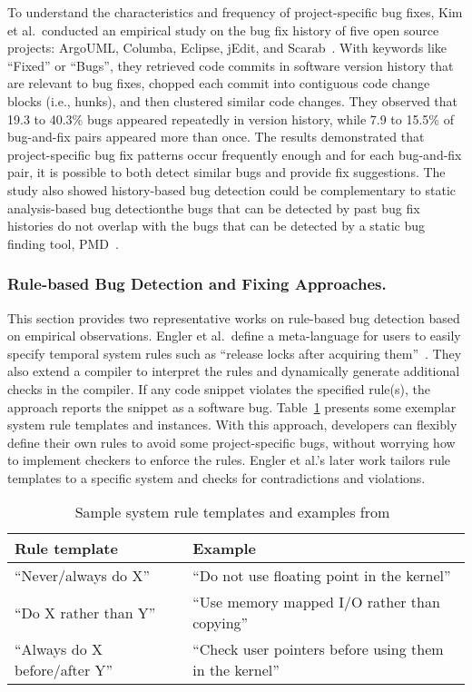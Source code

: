 To understand the characteristics and frequency of project-specific bug fixes, Kim et al.~conducted an empirical study on the bug fix history of five open source projects: ArgoUML, Columba, Eclipse, jEdit, and Scarab~\cite{Kim2006:MBF}. With keywords like ``Fixed'' or ``Bugs'', they retrieved code commits in software version history that are relevant to bug fixes, chopped each commit into contiguous code change blocks (i.e., hunks), and then clustered similar code changes. They observed that 19.3 to 40.3\% bugs appeared repeatedly in version history, while 7.9 to 15.5\% of bug-and-fix pairs appeared more than once. The results demonstrated that project-specific bug fix patterns occur frequently enough and for each bug-and-fix pair, it is possible to both detect similar bugs and provide fix suggestions. The study also showed history-based bug detection could be complementary to static analysis-based bug detection\textemdash the bugs that can be detected by past bug fix histories do not overlap with the bugs that can be detected by a static bug finding tool, PMD~\cite{PMD}. 


\subsubsection{Rule-based Bug Detection and Fixing Approaches.}
This section provides two representative works on rule-based bug detection based on empirical observations.
Engler et al.~define a meta-language for users to easily specify temporal system rules such as ``release locks after acquiring them''~\cite{Engler2000:CSR}. They also extend a compiler to interpret the rules and dynamically generate additional checks in the compiler. If any code snippet violates the specified rule(s), the approach reports the snippet as a software bug. Table~\ref{tab:rule} presents some exemplar system rule templates and instances. With this approach, developers can flexibly define their own rules to avoid some project-specific bugs, without worrying how to implement checkers to enforce the rules. Engler et al.'s later work tailors rule templates to a specific system and checks for contradictions and violations\cite{engler01bugs}.  

\begin{table}[]
\centering
\caption{Sample system rule templates and examples from~\cite{Engler2000:CSR}}
\label{tab:rule}
\begin{tabular}{l|l}
\toprule
Rule template                  & Example                                                 \\ \hline
``Never/always do X''          & ``Do not use floating point in the kernel''             \\\hline
``Do X rather than Y''         & ``Use memory mapped I/O rather than copying''           \\ \hline
``Always do X before/after Y'' & ``Check user pointers before using them in the kernel''\\
\bottomrule
\end{tabular}
\end{table} 


